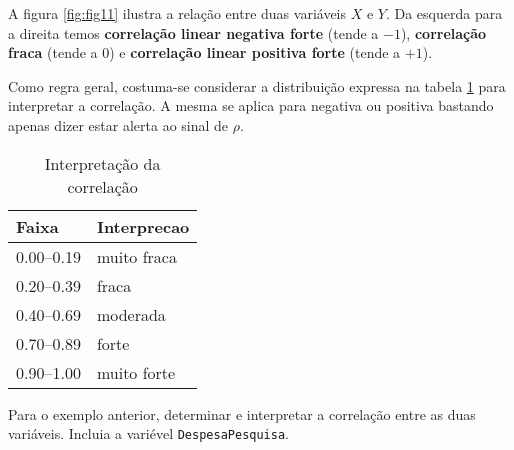 \documentclass[11pt,]{style/krantz}
\makeatletter
\newenvironment{Shaded}{\begin{snugshade}}{\end{snugshade}}
\newcommand{\DataTypeTok}[1]{\textcolor[rgb]{0.13,0.29,0.53}{#1}}
\newcommand{\DecValTok}[1]{\textcolor[rgb]{0.00,0.00,0.81}{#1}}
\newcommand{\KeywordTok}[1]{\textcolor[rgb]{0.13,0.29,0.53}{\textbf{#1}}}
\newcommand{\NormalTok}[1]{#1}
\newcommand{\OperatorTok}[1]{\textcolor[rgb]{0.81,0.36,0.00}{\textbf{#1}}}
\newcommand{\OtherTok}[1]{\textcolor[rgb]{0.56,0.35,0.01}{#1}}
\newcommand{\StringTok}[1]{\textcolor[rgb]{0.31,0.60,0.02}{#1}}
\newenvironment{kframe}{%
\medskip{}
\setlength{\fboxsep}{.8em}
 \def\at@end@of@kframe{}%
 \ifinner\ifhmode%
  \def\at@end@of@kframe{\end{minipage}}%
  \begin{minipage}{\columnwidth}%
 \fi\fi%
 \def\FrameCommand##1{\hskip\@totalleftmargin \hskip-\fboxsep
 \colorbox{shadecolor}{##1}\hskip-\fboxsep
     \hskip-\linewidth \hskip-\@totalleftmargin \hskip\columnwidth}%
 \MakeFramed {\advance\hsize-\width
   \@totalleftmargin\z@ \linewidth\hsize
   \@setminipage}}%
 {\par\unskip\endMakeFramed%
 \at@end@of@kframe}
\renewenvironment{Shaded}{\begin{kframe}}{\end{kframe}}
\theoremstyle{definition}
\theoremstyle{definition}
\theoremstyle{definition}
\theoremstyle{remark}
\let\BeginKnitrBlock\begin \let\EndKnitrBlock\end
\makeatother
\begin{document}
A figura \ref{fig:fig11} ilustra a relação entre duas variáveis \(X\) e \(Y\). Da esquerda para a direita temos \textbf{correlação linear negativa forte} (tende a \(-1\)), \textbf{correlação fraca} (tende a \(0\)) e \textbf{correlação linear positiva forte} (tende a \(+1\)).

Como regra geral, costuma-se considerar a distribuição expressa na tabela \ref{tab:tab13} para interpretar a correlação. A mesma se aplica para negativa ou positiva bastando apenas dizer estar alerta ao sinal de \(\rho\).

\begin{table}[!h]

\caption{\label{tab:tab13}Interpretação da correlação}
\centering
\begin{tabular}{ll}
\toprule
Faixa & Interprecao\\
\midrule
0.00--0.19 & muito fraca\\
0.20--0.39 & fraca\\
0.40--0.69 & moderada\\
0.70--0.89 & forte\\
0.90--1.00 & muito forte\\
\bottomrule
\end{tabular}
\end{table}

\BeginKnitrBlock{example}
\protect\hypertarget{exm:unnamed-chunk-104}{}{\label{exm:unnamed-chunk-104} }Para o exemplo anterior, determinar e interpretar a correlação entre as duas variáveis. Incluia a variével \texttt{DespesaPesquisa}.
\EndKnitrBlock{example}

\begin{Shaded}
\end{Shaded}
\end{document}
